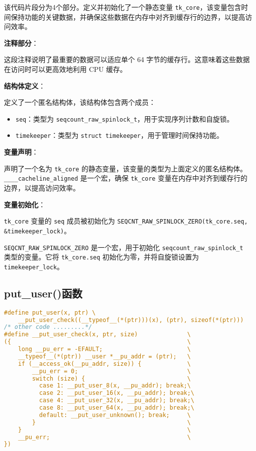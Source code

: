 \documentclass[12pt,hyperref,a4paper,UTF8]{ctexart}
\begin{document}
该代码片段分为4个部分。定义并初始化了一个静态变量 \lstinline|tk_core|，该变量包含时间保持功能的关键数据，并确保这些数据在内存中对齐到缓存行的边界，以提高访问效率。

\textbf{注释部分}：

这段注释说明了最重要的数据可以适应单个 64 字节的缓存行。这意味着这些数据在访问时可以更高效地利用 CPU 缓存。

\textbf{结构体定义}：

定义了一个匿名结构体，该结构体包含两个成员：
\begin{itemize}
    \item \lstinline|seq|：类型为 \lstinline|seqcount_raw_spinlock_t|，用于实现序列计数和自旋锁。
    \item \lstinline|timekeeper|：类型为 \lstinline|struct timekeeper|，用于管理时间保持功能。
\end{itemize}

\textbf{变量声明}：

声明了一个名为 \lstinline|tk_core| 的静态变量，该变量的类型为上面定义的匿名结构体。
\lstinline|____cacheline_aligned| 是一个宏，确保 \lstinline|tk_core| 变量在内存中对齐到缓存行的边界，以提高访问效率。

\textbf{变量初始化}：

\lstinline|tk_core| 变量的 \lstinline|seq| 成员被初始化为 \lstinline|SEQCNT_RAW_SPINLOCK_ZERO(tk_core.seq, &timekeeper_lock)|。

\lstinline|SEQCNT_RAW_SPINLOCK_ZERO| 是一个宏，用于初始化 \lstinline|seqcount_raw_spinlock_t| 类型的变量。它将 \lstinline|tk_core.seq| 初始化为零，并将自旋锁设置为 \lstinline|timekeeper_lock|。

\subsection{put\_user()函数}


\begin{lstlisting}[language=C, caption=put\_user() in uaccess.h, label=put_user]
#define put_user(x, ptr) \
    __put_user_check((__typeof__(*(ptr)))(x), (ptr), sizeof(*(ptr)))
/* other code .........*/
#define __put_user_check(x, ptr, size)              \
({                                                  \
    long __pu_err = -EFAULT;                        \
    __typeof__(*(ptr)) __user *__pu_addr = (ptr);   \
    if (__access_ok(__pu_addr, size)) {             \
        __pu_err = 0;                               \
        switch (size) {                             \
          case 1: __put_user_8(x, __pu_addr); break;\
          case 2: __put_user_16(x, __pu_addr); break;\
          case 4: __put_user_32(x, __pu_addr); break;\
          case 8: __put_user_64(x, __pu_addr); break;\
          default: __put_user_unknown(); break;     \
        }                                           \
    }                                               \
    __pu_err;                                       \
})
\end{lstlisting}
\end{document}
